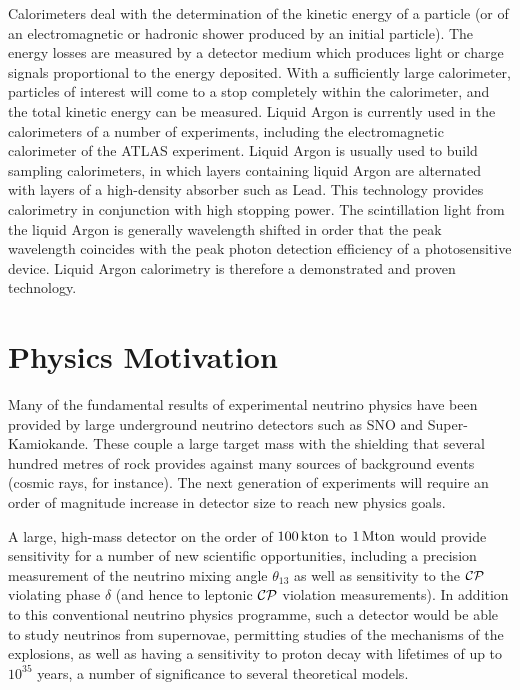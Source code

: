 Calorimeters deal with the determination of the kinetic energy of a particle (or of an electromagnetic or hadronic shower produced by an initial particle). The energy losses are measured by a detector medium which produces light or charge signals proportional to the energy deposited. With a sufficiently large calorimeter, particles of interest will come to a stop completely within the calorimeter, and the total kinetic energy can be measured. Liquid Argon is currently used in the calorimeters of a number of experiments, including the electromagnetic calorimeter of the ATLAS\citep{ATLAS1999} experiment. Liquid Argon is usually used to build sampling calorimeters, in which layers containing liquid Argon are alternated with layers of a high-density absorber such as Lead. This technology provides calorimetry in conjunction with high stopping power. The scintillation light from the liquid Argon is generally wavelength shifted in order that the peak wavelength coincides with the peak photon detection efficiency of a photosensitive device. Liquid Argon calorimetry is therefore a demonstrated and proven technology\citep{Aprile2006}.

\section{Physics Motivation}
Many of the fundamental results of experimental neutrino physics have been provided by large underground neutrino detectors such as SNO and Super-Kamiokande. These couple a large target mass with the shielding that several hundred metres of rock provides against many sources of background events (cosmic rays, for instance). The next generation of experiments will require an order of magnitude increase in detector size to reach new physics goals.

A large, high-mass detector on the order of $100\,\mathrm{kton}$ to $1\,\mathrm{Mton}$ would provide sensitivity for a number of new scientific opportunities, including a precision measurement of the neutrino mixing angle $\theta_{13}$ as well as sensitivity to the $\mathcal{C}\mathcal{P}$ violating phase $\delta$ (and hence to leptonic $\mathcal{C}\mathcal{P}$ violation measurements). In addition to this conventional neutrino physics programme, such a detector would be able to study neutrinos from supernovae, permitting studies of the mechanisms of the explosions, as well as having a sensitivity to proton decay with lifetimes of up to $10^{35}$ years, a number of significance to several theoretical models\citep{Laguna2009}.

